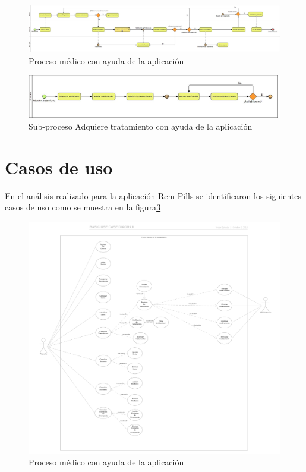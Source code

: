 \begin{figure}[htb]
	\centering
	\includegraphics[width=1.1\textwidth]{images/cap2/Proceso2}
	\caption{Proceso médico con ayuda de la aplicación} \label{fig:proceso2}
\end{figure}

\begin{figure}[htb]
	\centering
	\includegraphics[width=1.1\textwidth]{images/cap2/AdquiereTratamientoP2}
	\caption{Sub-proceso Adquiere tratamiento con ayuda de la aplicación} \label{fig:subproceso2}
\end{figure}


\section{Casos de uso}
En el análisis realizado para la aplicación Rem-Pills se identificaron los siguientes casos de uso como se muestra en la figura\ref{fig:casosdeuso}

\begin{figure}[htb]
	\centering
	\includegraphics[width=1.1\textwidth]{images/cap2/casosdeuso}
	\caption{Proceso médico con ayuda de la aplicación} \label{fig:casosdeuso}
\end{figure} 

